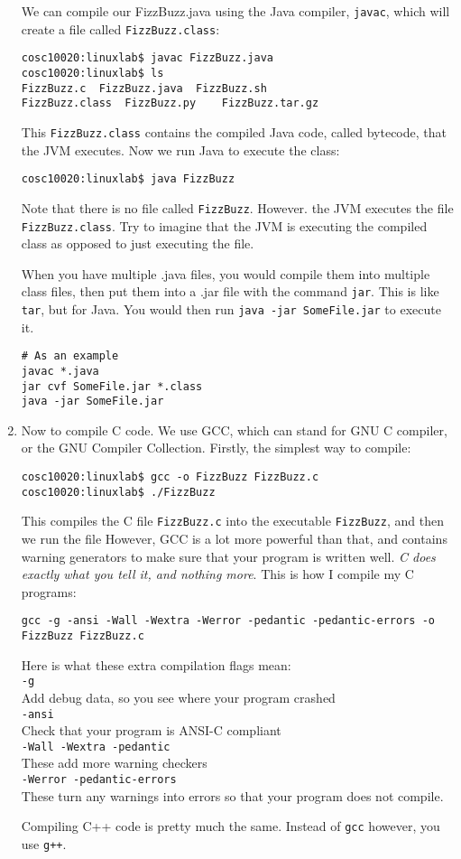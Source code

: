 \documentclass{article}
\begin{document}
\begin{enumerate}
We can compile our FizzBuzz.java using the Java compiler, \texttt{javac}, which will create a file called \texttt{FizzBuzz.class}:
\begin{verbatim}
cosc10020:linuxlab$ javac FizzBuzz.java
cosc10020:linuxlab$ ls
FizzBuzz.c	FizzBuzz.java  FizzBuzz.sh
FizzBuzz.class	FizzBuzz.py    FizzBuzz.tar.gz
\end{verbatim}
This \texttt{FizzBuzz.class} contains the compiled Java code, called bytecode, that the JVM executes. Now we run Java to execute the class:
\begin{verbatim}
cosc10020:linuxlab$ java FizzBuzz
\end{verbatim}
Note that there is no file called \texttt{FizzBuzz}. However. the JVM executes the file \texttt{FizzBuzz.class}. Try to imagine that the JVM is executing the compiled class as opposed to just executing the file.

When you have multiple .java files, you would compile them into multiple class files, then put them into a .jar file with the command \texttt{jar}. This is like \texttt{tar}, but for Java. You would then run \texttt{java -jar SomeFile.jar} to execute it.
\begin{verbatim}
# As an example
javac *.java
jar cvf SomeFile.jar *.class
java -jar SomeFile.jar
\end{verbatim}

\item Now to compile C code. We use GCC, which can stand for GNU C compiler, or the GNU Compiler Collection. Firstly, the simplest way to compile:
\begin{verbatim}
cosc10020:linuxlab$ gcc -o FizzBuzz FizzBuzz.c
cosc10020:linuxlab$ ./FizzBuzz
\end{verbatim}
This compiles the C file \texttt{FizzBuzz.c} into the executable \texttt{FizzBuzz}, and then we run the file  However, GCC is a lot more powerful than that, and contains warning generators to make sure that your program is written well. \emph{C does exactly what you tell it, and nothing more}. This is how I compile my C programs:
\begin{verbatim}
gcc -g -ansi -Wall -Wextra -Werror -pedantic -pedantic-errors -o FizzBuzz FizzBuzz.c
\end{verbatim}
Here is what these extra compilation flags mean: \\
\texttt{-g} \\
Add debug data, so you see where your program crashed\\
\texttt{-ansi} \\
Check that your program is ANSI-C compliant\\
\texttt{-Wall -Wextra -pedantic} \\
These add more warning checkers\\
\texttt{-Werror -pedantic-errors} \\
These turn any warnings into errors so that your program does not compile.

Compiling C++ code is pretty much the same. Instead of \texttt{gcc} however, you use \texttt{g++}.

\end{enumerate}
\end{document}
